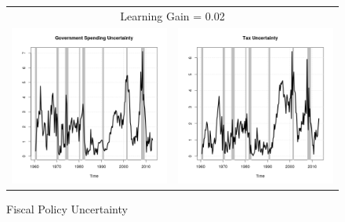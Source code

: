 \documentclass[11pt]{article}
\begin{document}
\begin{figure}\caption{Fiscal Policy Uncertainty}\label{fg:fpu0.02}
\begin{center}
\begin{tabular}{cc}
\multicolumn{2}{c}{Learning Gain = 0.02} \\ [0.5pc]
\includegraphics[scale=0.45]{./results/pics0.02/fpu_gov.png} & \includegraphics[scale=0.45]{./results/pics0.02/fpu_tax.png} \\

\end{tabular}
\end{center}
\end{figure}
\end{document}

